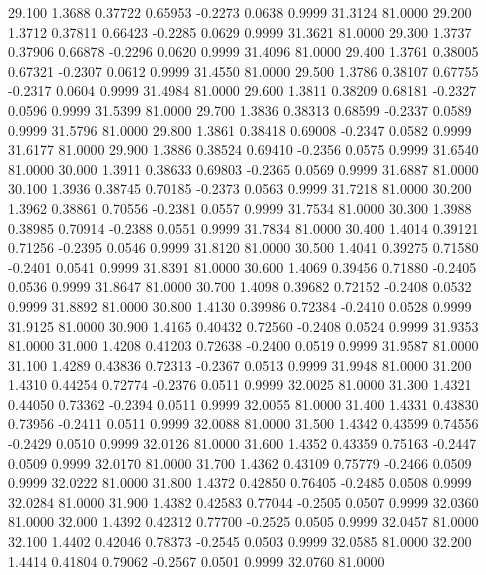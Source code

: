   29.100   1.3688   0.37722   0.65953  -0.2273   0.0638   0.9999  31.3124  81.0000
  29.200   1.3712   0.37811   0.66423  -0.2285   0.0629   0.9999  31.3621  81.0000
  29.300   1.3737   0.37906   0.66878  -0.2296   0.0620   0.9999  31.4096  81.0000
  29.400   1.3761   0.38005   0.67321  -0.2307   0.0612   0.9999  31.4550  81.0000
  29.500   1.3786   0.38107   0.67755  -0.2317   0.0604   0.9999  31.4984  81.0000
  29.600   1.3811   0.38209   0.68181  -0.2327   0.0596   0.9999  31.5399  81.0000
  29.700   1.3836   0.38313   0.68599  -0.2337   0.0589   0.9999  31.5796  81.0000
  29.800   1.3861   0.38418   0.69008  -0.2347   0.0582   0.9999  31.6177  81.0000
  29.900   1.3886   0.38524   0.69410  -0.2356   0.0575   0.9999  31.6540  81.0000
  30.000   1.3911   0.38633   0.69803  -0.2365   0.0569   0.9999  31.6887  81.0000
  30.100   1.3936   0.38745   0.70185  -0.2373   0.0563   0.9999  31.7218  81.0000
  30.200   1.3962   0.38861   0.70556  -0.2381   0.0557   0.9999  31.7534  81.0000
  30.300   1.3988   0.38985   0.70914  -0.2388   0.0551   0.9999  31.7834  81.0000
  30.400   1.4014   0.39121   0.71256  -0.2395   0.0546   0.9999  31.8120  81.0000
  30.500   1.4041   0.39275   0.71580  -0.2401   0.0541   0.9999  31.8391  81.0000
  30.600   1.4069   0.39456   0.71880  -0.2405   0.0536   0.9999  31.8647  81.0000
  30.700   1.4098   0.39682   0.72152  -0.2408   0.0532   0.9999  31.8892  81.0000
  30.800   1.4130   0.39986   0.72384  -0.2410   0.0528   0.9999  31.9125  81.0000
  30.900   1.4165   0.40432   0.72560  -0.2408   0.0524   0.9999  31.9353  81.0000
  31.000   1.4208   0.41203   0.72638  -0.2400   0.0519   0.9999  31.9587  81.0000
  31.100   1.4289   0.43836   0.72313  -0.2367   0.0513   0.9999  31.9948  81.0000
  31.200   1.4310   0.44254   0.72774  -0.2376   0.0511   0.9999  32.0025  81.0000
  31.300   1.4321   0.44050   0.73362  -0.2394   0.0511   0.9999  32.0055  81.0000
  31.400   1.4331   0.43830   0.73956  -0.2411   0.0511   0.9999  32.0088  81.0000
  31.500   1.4342   0.43599   0.74556  -0.2429   0.0510   0.9999  32.0126  81.0000
  31.600   1.4352   0.43359   0.75163  -0.2447   0.0509   0.9999  32.0170  81.0000
  31.700   1.4362   0.43109   0.75779  -0.2466   0.0509   0.9999  32.0222  81.0000
  31.800   1.4372   0.42850   0.76405  -0.2485   0.0508   0.9999  32.0284  81.0000
  31.900   1.4382   0.42583   0.77044  -0.2505   0.0507   0.9999  32.0360  81.0000
  32.000   1.4392   0.42312   0.77700  -0.2525   0.0505   0.9999  32.0457  81.0000
  32.100   1.4402   0.42046   0.78373  -0.2545   0.0503   0.9999  32.0585  81.0000
  32.200   1.4414   0.41804   0.79062  -0.2567   0.0501   0.9999  32.0760  81.0000
